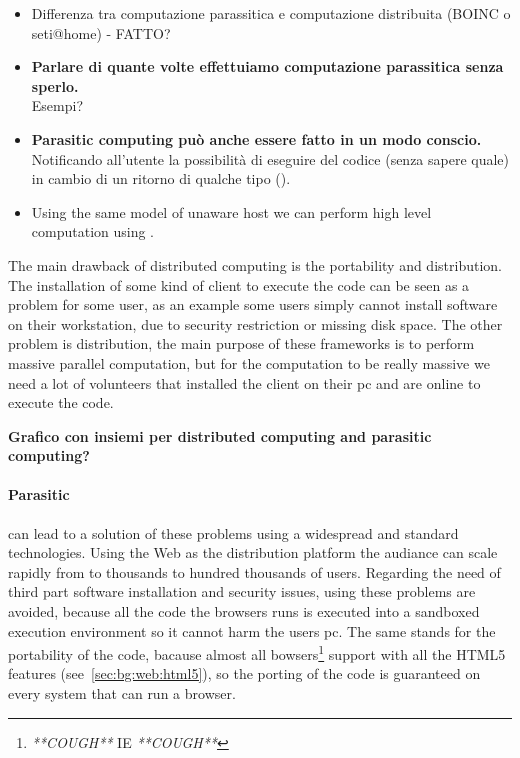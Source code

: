 \begin{itemize}
	\item Differenza tra computazione parassitica e computazione distribuita (BOINC o seti@home) - FATTO?
	
	\item \textbf{Parlare di quante volte effettuiamo computazione parassitica senza sperlo.}\\Esempi?

	\item \textbf{Parasitic computing può anche essere fatto in un modo conscio.} Notificando
	all'utente la possibilità di eseguire del codice (senza sapere quale) in cambio di un ritorno di qualche
	tipo (\cite{karame2011pay}).

	\item Using the same model of unaware host we can perform high level computation using
	\js{}.
\end{itemize}

The main drawback of distributed computing is the portability and distribution.
The installation of some kind of client to execute the code can be seen as a problem for some
user, as an example some users simply cannot install software on their workstation, due to security
restriction or missing disk space. The other problem is distribution, the main purpose of these
frameworks is to perform massive parallel computation, but for the computation to be really 
massive we need a lot of volunteers that installed the client on their pc and are online to execute
the code.

{\bf Grafico con insiemi per distributed computing and parasitic computing?}

\paragraph{Parasitic \js{}} can lead to a solution of these problems using a widespread
and standard technologies. Using the Web as the distribution platform the audiance can scale
rapidly from to thousands to hundred thousands of users. Regarding the need of third part software
installation and security issues, using \js{} these problems are avoided, because all the code the browsers
runs is executed into a sandboxed execution environment so it cannot harm the users pc. The same stands
for the portability of the code, bacause almost all bowsers\footnote{\emph{**COUGH**} IE \emph{**COUGH**}} support
\js{} with all the HTML5 features (see~\ref{sec:bg:web:html5}), so the porting of the code
is guaranteed on every system that can run a browser.


